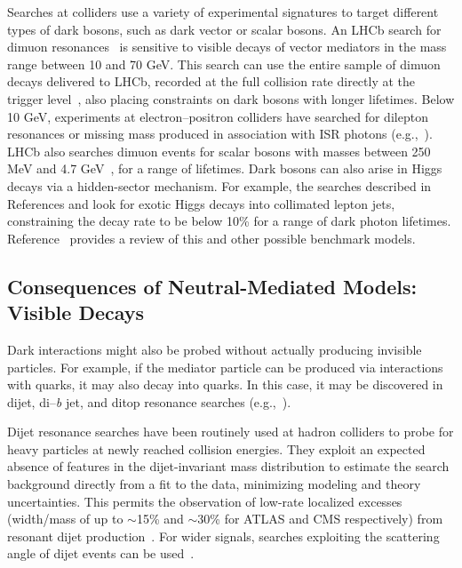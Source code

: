 \documentclass{ar-1col}
\newcommand{\IP}{invisible particle}
\begin{document}
{Searches at colliders use a variety of experimental signatures to
target different types of dark bosons, such as dark vector or
scalar bosons. An LHCb search for dimuon
resonances~\cite{Aaij:2017rft} is sensitive to visible decays of
vector mediators in the mass range between 10 and 70 GeV. This
search can use the entire sample of dimuon decays delivered to
LHCb, recorded at the full collision rate directly at the trigger
level~\cite{Aaij:2016rxn}, also placing constraints on dark bosons with longer lifetimes. 
Below 10 GeV, experiments at
electron--positron colliders have searched for dilepton resonances
or missing mass produced in association with ISR photons (e.g.,~). 
LHCb also searches dimuon
events for scalar bosons with masses between 250 MeV and 4.7
GeV~\cite{Aaij:2016qsm}, for a range of lifetimes. Dark bosons can
also arise in Higgs decays via a hidden-sector mechanism. For
example, the searches described in References  and 
look for exotic Higgs decays into collimated lepton jets,
constraining the decay rate to be below 10\% for a range of dark
photon lifetimes. Reference~ provides a review of this and other
possible benchmark models.

\subsection{Consequences of Neutral-Mediated Models: Visible Decays}\label{sec:MediatorSearches} \label{sub:twoBody}

Dark interactions might also be probed without actually producing
{\IP}s. For example, if the mediator particle can be produced via
interactions with quarks, it may also decay into quarks. In this
case, it may be discovered in dijet, di--\textit{b} jet, and ditop resonance searches
(e.g.,~).

Dijet resonance searches have been routinely used at hadron
colliders to probe for heavy particles at newly reached collision
energies. They exploit an expected absence of features in the
dijet-invariant mass distribution to estimate the search
background directly from a fit to the data, minimizing modeling
and theory uncertainties. This permits the observation of low-rate
localized excesses (width/mass of up to $\sim$15\% and $\sim$30\%
for ATLAS and CMS respectively) from resonant
dijet production~\cite{Aaboud:2017yvp,Sirunyan:2018xlo}. For
wider signals, searches exploiting the scattering angle of dijet
events can be used~\cite{CMS-PAS-EXO-16-046,Aaboud:2017yvp}.

}
\end{document}
